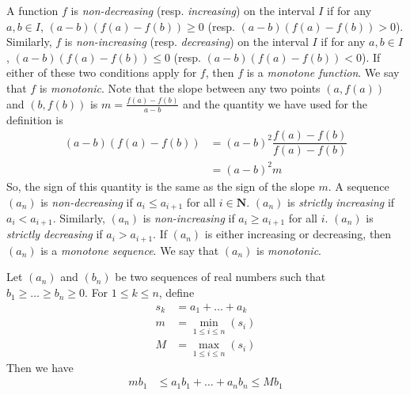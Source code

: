 \documentclass{subfile}
\begin{document}
			A function $f$ is \emph{non-decreasing} (resp. \emph{increasing}) on the interval $I$ if for any $a,b\in I$, $(a-b)(f(a)-f(b))\geq0$ (resp. $(a-b)(f(a)-f(b))>0$). Similarly, $f$ is \emph{non-increasing} (resp. \emph{decreasing}) on the interval $I$ if for any $a,b\in I$, $(a-b)(f(a)-f(b))\leq0$ (resp. $(a-b)(f(a)-f(b))<0$). If either of these two conditions apply for $f$, then $f$ is a \emph{monotone function}. We say that $f$ is \emph{monotonic}.
	Note that the slope between any two points $(a,f(a))$ and $(b,f(b))$ is $m=\frac{f(a)-f(b)}{a-b}$ and the quantity we have used for the definition is
		\begin{align*}
			(a-b)(f(a)-f(b))
				& = (a-b)^2\dfrac{f(a)-f(b)}{f(a)-f(b)}\\
				& = (a-b)^2m
		\end{align*}
	So, the sign of this quantity is the same as the sign of the slope $m$.
			A sequence $(a_n)$ is \emph{non-decreasing} if $a_i\leq a_{i+1}$ for all $i\in\mathbf{N}$. $(a_n)$ is \emph{strictly increasing} if $a_i<a_{i+1}$. Similarly, $(a_n)$ is \emph{non-increasing} if $a_i\geq a_{i+1}$ for all $i$. $(a_n)$ is \emph{strictly decreasing} if $a_i>a_{i+1}$. If $(a_n)$ is either increasing or decreasing, then $(a_n)$ is a \emph{monotone sequence}. We say that $(a_n)$ is \emph{monotonic}.
	
		\begin{theorem}
			Let $(a_n)$ and $(b_n)$ be two sequences of real numbers such that $b_1\geq \ldots\geq b_n\geq0$. For $1\leq k\leq n$, define
				\begin{align*}
					s_k
						& = a_1+\ldots+a_k\\
					m
						& = \min_{1\leq i\leq n}(s_i)\\
					M
						& = \max_{1\leq i\leq n}(s_i)
				\end{align*}
			Then we have
				\begin{align*}
					mb_1
						& \leq a_1b_1+\ldots+a_nb_n\leq  Mb_1
				\end{align*}
		\end{theorem}
	
\end{document}
